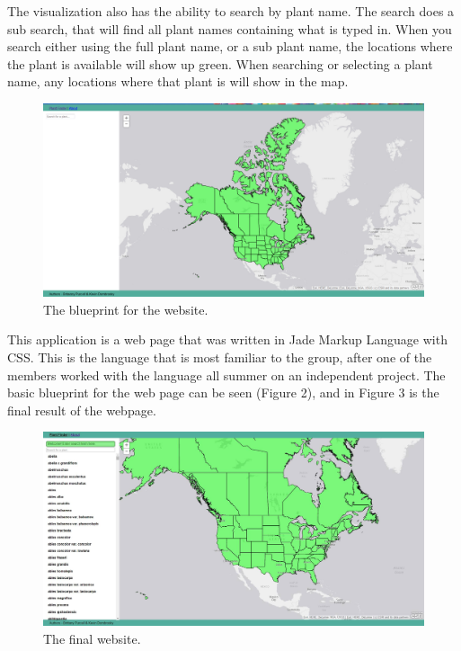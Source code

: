 \documentclass{Group6_Phase2}
\begin{document}
The visualization also has the ability to search by plant name. The search does a sub search, that will find all plant names containing what is typed in. When you search either using the full plant name, or a sub plant name, the locations where the plant is available will show up green. When searching or selecting a plant name, any locations where that plant is will show in the map. 

\begin{figure}[htb]
	\centering
	\includegraphics[scale=0.17]{Website_Screenshot.png}
	\caption{The blueprint for the website.}
\end{figure}


This application is a web page that was written in Jade Markup Language with CSS. This is the language that is most familiar to the group, after one of the members worked with the language all summer on an independent project. The basic blueprint for the web page can be seen (Figure 2), and in Figure 3 is the final result of the webpage.

\begin{figure}[htb]
	\centering
	\includegraphics[scale=0.12]{finalScreenshot.jpg}
	\caption{The final website.}
\end{figure}
\end{document}
